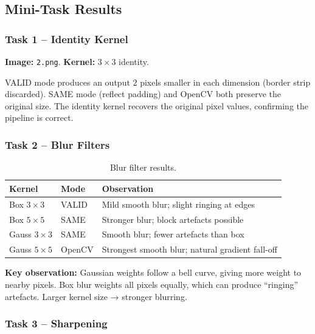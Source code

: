 \documentclass[12pt,a4paper]{article}
\begin{document}
\subsection{Mini-Task Results}

\subsubsection*{Task 1 -- Identity Kernel}
\textbf{Image:} \texttt{2.png}. \textbf{Kernel:} $3\times3$ identity.

VALID mode produces an output $2$ pixels smaller in each dimension (border strip
discarded). SAME mode (reflect padding) and OpenCV both preserve the original size.
The identity kernel recovers the original pixel values, confirming the pipeline is correct.

\subsubsection*{Task 2 -- Blur Filters}

\begin{table}[H]
  \centering
  \begin{tabular}{@{}llp{7cm}@{}}
    \toprule
    Kernel & Mode & Observation \\
    \midrule
    Box $3\times3$    & VALID & Mild smooth blur; slight ringing at edges \\
    Box $5\times5$    & SAME  & Stronger blur; block artefacts possible \\
    Gauss $3\times3$  & SAME  & Smooth blur; fewer artefacts than box \\
    Gauss $5\times5$  & OpenCV & Strongest smooth blur; natural gradient fall-off \\
    \bottomrule
  \end{tabular}
  \caption{Blur filter results.}
\end{table}

\textbf{Key observation:} Gaussian weights follow a bell curve, giving more weight
to nearby pixels. Box blur weights all pixels equally, which can produce ``ringing''
artefacts. Larger kernel size → stronger blurring.

\subsubsection*{Task 3 -- Sharpening}
\end{document}
